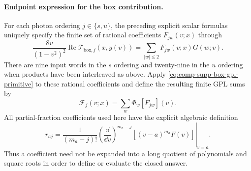 \paragraph{Endpoint expression for the box contribution.}
For each photon ordering $j\in\{s,u\}$, the preceding explicit
scalar formulas uniquely specify the finite set of rational
coefficients $F_{jw}(v;x)$ through
\begin{equation}
 \frac{8v}{(1-v^2)^2}
       \operatorname{Re}\mathcal T_{\mathrm{box},j}(x,y(v))
       =\sum_{|w|\leq2}F_{jw}(v;x)G(w;v).
\end{equation}
There are nine input words in the $s$ ordering and twenty-nine
in the $u$ ordering when products have been interleaved as above.
Apply \eqref{eq:comp-supp-box-gpl-primitive} to these rational
coefficients and define the resulting finite GPL sums by
\begin{equation}
 \mathcal F_j(v;x)=\sum_w\Phi_w[F_{jw}](v).
\end{equation}
All partial-fraction coefficients used here have the explicit
algebraic definition
\begin{equation}
 r_{aj}=\frac1{(m_a-j)!}
 \left.\left(\frac{\dd}{\dd v}\right)^{m_a-j}
                  [(v-a)^{m_a}F(v)]\right|_{v=a}.
\end{equation}
Thus a coefficient need not be expanded into a long quotient of
polynomials and square roots in order to define or evaluate the
closed answer.

